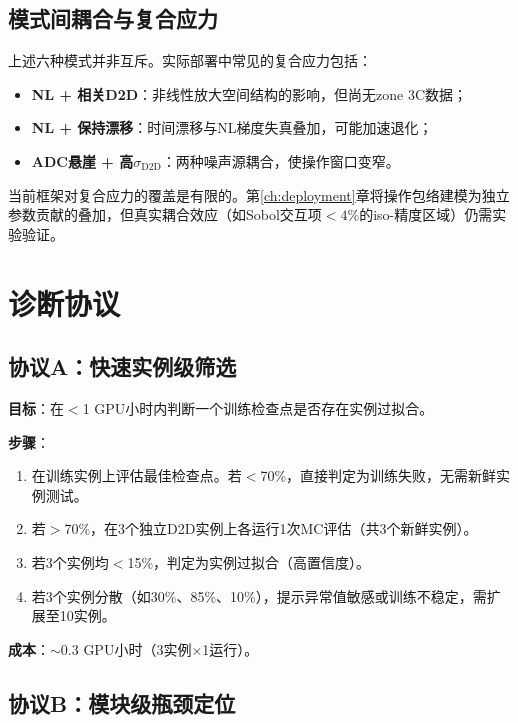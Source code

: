 \subsection{模式间耦合与复合应力}
\label{subsec:failure_compound}

上述六种模式并非互斥。实际部署中常见的复合应力包括：
\begin{itemize}
    \item \textbf{NL + 相关D2D}：非线性放大空间结构的影响，但尚无zone 3C数据；
    \item \textbf{NL + 保持漂移}：时间漂移与NL梯度失真叠加，可能加速退化；
    \item \textbf{ADC悬崖 + 高$\sigma_{\mathrm{D2D}}$}：两种噪声源耦合，使操作窗口变窄。
\end{itemize}

当前框架对复合应力的覆盖是有限的。第\ref{ch:deployment}章将操作包络建模为独立参数贡献的叠加，但真实耦合效应（如Sobol交互项$<4\%$的iso-精度区域）仍需实验验证。


\section{诊断协议}
\label{sec:diagnostic_protocols}

\subsection{协议A：快速实例级筛选}
\label{subsec:protocol_a}

\textbf{目标}：在$<$1 GPU小时内判断一个训练检查点是否存在实例过拟合。

\textbf{步骤}：
\begin{enumerate}
    \item 在训练实例上评估最佳检查点。若$<$70\%，直接判定为训练失败，无需新鲜实例测试。
    \item 若$>$70\%，在3个独立D2D实例上各运行1次MC评估（共3个新鲜实例）。
    \item 若3个实例均$<$15\%，判定为实例过拟合（高置信度）。
    \item 若3个实例分散（如30\%、85\%、10\%），提示异常值敏感或训练不稳定，需扩展至10实例。
\end{enumerate}

\textbf{成本}：$\sim$0.3 GPU小时（3实例$\times$1运行）。

\subsection{协议B：模块级瓶颈定位}
\label{subsec:protocol_b}

